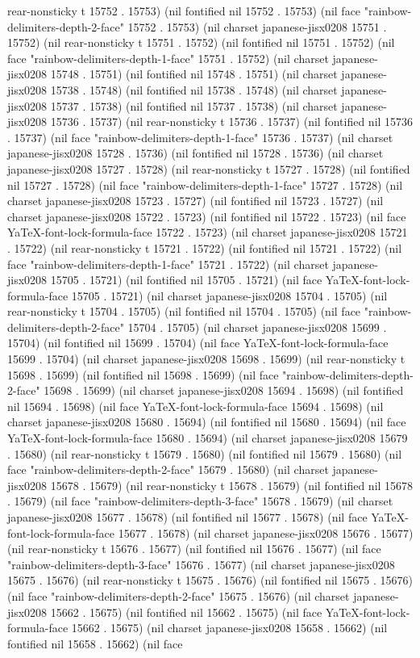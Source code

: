 rear-nonsticky t 15752 . 15753) (nil fontified nil 15752 . 15753) (nil face "rainbow-delimiters-depth-2-face" 15752 . 15753) (nil charset japanese-jisx0208 15751 . 15752) (nil rear-nonsticky t 15751 . 15752) (nil fontified nil 15751 . 15752) (nil face "rainbow-delimiters-depth-1-face" 15751 . 15752) (nil charset japanese-jisx0208 15748 . 15751) (nil fontified nil 15748 . 15751) (nil charset japanese-jisx0208 15738 . 15748) (nil fontified nil 15738 . 15748) (nil charset japanese-jisx0208 15737 . 15738) (nil fontified nil 15737 . 15738) (nil charset japanese-jisx0208 15736 . 15737) (nil rear-nonsticky t 15736 . 15737) (nil fontified nil 15736 . 15737) (nil face "rainbow-delimiters-depth-1-face" 15736 . 15737) (nil charset japanese-jisx0208 15728 . 15736) (nil fontified nil 15728 . 15736) (nil charset japanese-jisx0208 15727 . 15728) (nil rear-nonsticky t 15727 . 15728) (nil fontified nil 15727 . 15728) (nil face "rainbow-delimiters-depth-1-face" 15727 . 15728) (nil charset japanese-jisx0208 15723 . 15727) (nil fontified nil 15723 . 15727) (nil charset japanese-jisx0208 15722 . 15723) (nil fontified nil 15722 . 15723) (nil face YaTeX-font-lock-formula-face 15722 . 15723) (nil charset japanese-jisx0208 15721 . 15722) (nil rear-nonsticky t 15721 . 15722) (nil fontified nil 15721 . 15722) (nil face "rainbow-delimiters-depth-1-face" 15721 . 15722) (nil charset japanese-jisx0208 15705 . 15721) (nil fontified nil 15705 . 15721) (nil face YaTeX-font-lock-formula-face 15705 . 15721) (nil charset japanese-jisx0208 15704 . 15705) (nil rear-nonsticky t 15704 . 15705) (nil fontified nil 15704 . 15705) (nil face "rainbow-delimiters-depth-2-face" 15704 . 15705) (nil charset japanese-jisx0208 15699 . 15704) (nil fontified nil 15699 . 15704) (nil face YaTeX-font-lock-formula-face 15699 . 15704) (nil charset japanese-jisx0208 15698 . 15699) (nil rear-nonsticky t 15698 . 15699) (nil fontified nil 15698 . 15699) (nil face "rainbow-delimiters-depth-2-face" 15698 . 15699) (nil charset japanese-jisx0208 15694 . 15698) (nil fontified nil 15694 . 15698) (nil face YaTeX-font-lock-formula-face 15694 . 15698) (nil charset japanese-jisx0208 15680 . 15694) (nil fontified nil 15680 . 15694) (nil face YaTeX-font-lock-formula-face 15680 . 15694) (nil charset japanese-jisx0208 15679 . 15680) (nil rear-nonsticky t 15679 . 15680) (nil fontified nil 15679 . 15680) (nil face "rainbow-delimiters-depth-2-face" 15679 . 15680) (nil charset japanese-jisx0208 15678 . 15679) (nil rear-nonsticky t 15678 . 15679) (nil fontified nil 15678 . 15679) (nil face "rainbow-delimiters-depth-3-face" 15678 . 15679) (nil charset japanese-jisx0208 15677 . 15678) (nil fontified nil 15677 . 15678) (nil face YaTeX-font-lock-formula-face 15677 . 15678) (nil charset japanese-jisx0208 15676 . 15677) (nil rear-nonsticky t 15676 . 15677) (nil fontified nil 15676 . 15677) (nil face "rainbow-delimiters-depth-3-face" 15676 . 15677) (nil charset japanese-jisx0208 15675 . 15676) (nil rear-nonsticky t 15675 . 15676) (nil fontified nil 15675 . 15676) (nil face "rainbow-delimiters-depth-2-face" 15675 . 15676) (nil charset japanese-jisx0208 15662 . 15675) (nil fontified nil 15662 . 15675) (nil face YaTeX-font-lock-formula-face 15662 . 15675) (nil charset japanese-jisx0208 15658 . 15662) (nil fontified nil 15658 . 15662) (nil face 
